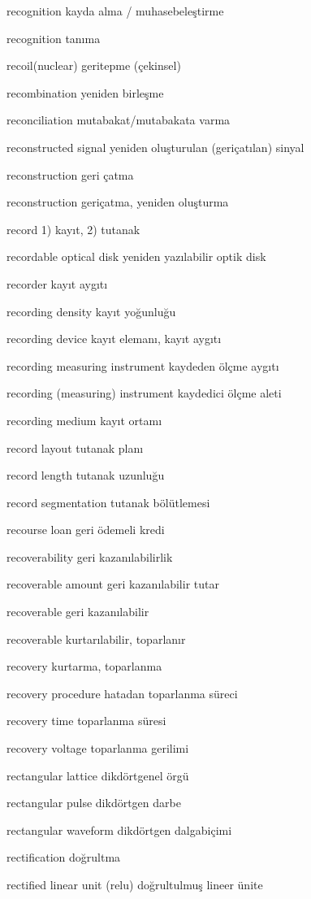 \documentclass[12pt,fleqn]{article}\usepackage{../../common}
\begin{document}
recognition kayda alma / muhasebeleştirme

recognition tanıma

recoil(nuclear) geritepme (çekinsel)

recombination yeniden birleşme

reconciliation mutabakat/mutabakata varma

reconstructed signal yeniden oluşturulan (geriçatılan) sinyal

reconstruction geri çatma

reconstruction geriçatma, yeniden oluşturma

record 1) kayıt, 2) tutanak

recordable optical disk yeniden yazılabilir optik disk

recorder kayıt aygıtı

recording density kayıt yoğunluğu

recording device kayıt elemanı, kayıt aygıtı

recording measuring instrument kaydeden ölçme aygıtı

recording (measuring) instrument kaydedici ölçme aleti

recording medium kayıt ortamı

record layout tutanak planı

record length tutanak uzunluğu

record segmentation tutanak bölütlemesi

recourse loan geri ödemeli kredi

recoverability geri kazanılabilirlik

recoverable amount geri kazanılabilir tutar

recoverable geri kazanılabilir

recoverable kurtarılabilir, toparlanır

recovery kurtarma, toparlanma

recovery procedure hatadan toparlanma süreci

recovery time toparlanma süresi

recovery voltage toparlanma gerilimi

rectangular lattice dikdörtgenel örgü

rectangular pulse dikdörtgen darbe

rectangular waveform dikdörtgen dalgabiçimi

rectification doğrultma

rectified linear unit (relu) doğrultulmuş lineer ünite
\end{document}
